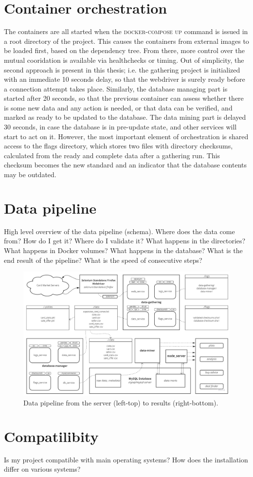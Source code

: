 \section{Container orchestration}
The containers are all started when the \textsc{docker-compose up} command is issued in a root directory of the project. This causes the containers from external images to be loaded first, based on the dependency tree. From there, more control over the mutual cooridation is available via healthchecks or timing. Out of simplicity, the second approach is present in this thesis; i.e. the gathering project is initialized with an immediate 10 seconds delay, so that the webdriver is surely ready before a connection attempt takes place. Similarly, the database managing part is started after 20 seconds, so that the previous container can assess whether there is some new data and any action is needed, or that data can be verified, and marked as ready to be updated to the database. The data mining part is delayed 30 seconds, in case the database is in pre-update state, and other services will start to act on it. However, the most important element of orchestration is shared access to the flags directory, which stores two files with directory checksums, calculated from the ready and complete data after a gathering run. This checksum becomes the new standard and an indicator that the database contents may be outdated.

\section{Data pipeline}
High level overview of the data pipeline (schema).
Where does the data come from? How do I get it?
Where do I validate it? What happens in the directories?
What happens in Docker volumes? What happens in the database?
What is the end result of the pipeline?
What is the speed of consecutive steps?

\begin{figure}[h!]
\centering
\includegraphics[width=\textwidth]{figures/warehousing.jpg}
\caption{Data pipeline from the server (left-top) to results (right-bottom).}
\end{figure}


\section{Compatilibity}
Is my project compatible with main operating systems?
How does the installation differ on various systems?

